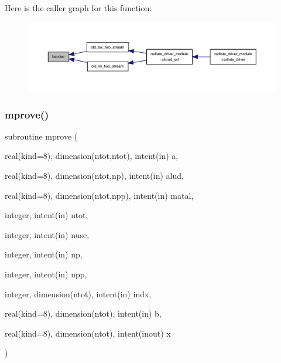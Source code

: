 Here is the caller graph for this function\+:
\nopagebreak
\begin{figure}[H]
\begin{center}
\leavevmode
\includegraphics[width=350pt]{old__twostream__rad_8f90_a6ebe8b542c9350d34aae0515753b29bf_icgraph}
\end{center}
\end{figure}
\mbox{\label{old__twostream__rad_8f90_a4706dfdfc064dbcb59617aad9d555474}} 
\subsubsection{\texorpdfstring{mprove()}{mprove()}}
{\footnotesize\ttfamily subroutine mprove (\begin{DoxyParamCaption}\item[{real(kind=8), dimension(ntot,ntot), intent(in)}]{a,  }\item[{real(kind=8), dimension(ntot,np), intent(in)}]{alud,  }\item[{real(kind=8), dimension(ntot,npp), intent(in)}]{matal,  }\item[{integer, intent(in)}]{ntot,  }\item[{integer, intent(in)}]{nuse,  }\item[{integer, intent(in)}]{np,  }\item[{integer, intent(in)}]{npp,  }\item[{integer, dimension(ntot), intent(in)}]{indx,  }\item[{real(kind=8), dimension(ntot), intent(in)}]{b,  }\item[{real(kind=8), dimension(ntot), intent(inout)}]{x }\end{DoxyParamCaption})}

